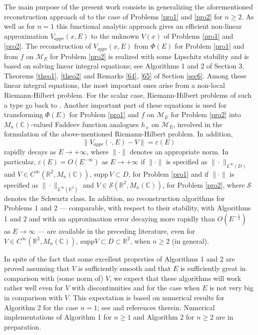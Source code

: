 \documentclass[11pt,a4paper,english,subeqn]{amsart}
\theoremstyle{plain}
\theoremstyle{definition}
\numberwithin{equation}{section}
\begin{document}
The main purpose of the present work consists in generalizing the aforementioned reconstruction approach of \cite{N3, N4} to the case of Problems \ref{pro1} and \ref{pro2} for $n \geq 2$. As well as for $n=1$ this functional analytic approach gives an efficient non-linear approximation $V_{appr}(x,E)$ to the unknown $V(x)$ of Problems \ref{pro1} and \ref{pro2}. The reconstruction of $V_{appr}(x,E)$ from $\Phi(E)$ for Problem \ref{pro1} and from $f$ on ${\mathscr{M}_E}$ for Problem \ref{pro2} is realized with some Lipschitz stability and is based on solving linear integral equations; see Algorithms 1 and 2 of Section 3, Theorems \ref{theo1}, \ref{theo2} and Remarks \ref{64}, \ref{65} of Section \ref{sec6}. Among these linear integral equations, the most important ones arise from a non-local Riemann-Hilbert problem. For the scalar case, Riemann-Hilbert problems of such a type go
back to \cite{M}. Another important part of these equations is used for transforming $\Phi(E)$ for Problem \ref{pro1} and $f$ on ${\mathscr{M}_E}$ for Problem \ref{pro2} into ${M_{n}({\mathbb{C}})}$-valued Faddeev function analogues $h_{\pm}$ on ${\mathscr{M}_E}$, involved in the formulation of the above-mentioned Riemann-Hilbert problem. In addition,
\begin{equation} \nonumber
\| V_{appr}(\cdot , E) - V\| = \varepsilon(E)
\end{equation}
rapidly decays as $E \to +\infty$, where $\| \cdot \|$ denotes an appropriate norm. In par\-ticular, $\varepsilon(E) = O(E^{- \infty})$ as $E \to + \infty$ if $\| \cdot \|$ is specified as $\| \cdot \|_{L^{\infty}(D)}$ and $V \in C^{\infty}({\mathbb{R}}^2, {M_{n}({\mathbb{C}})})$, $\mathrm{supp}\, V \subset D$, for Problem \ref{pro1} and if $\| \cdot \|$ is specified as $\| \cdot \|_{L^{\infty}({\mathbb{R}}^2)}$ and $V \in {\mathcal{S}}({\mathbb{R}}^2, {M_{n}({\mathbb{C}})})$, for Problem \ref{pro2}, where ${\mathcal{S}}$ denotes the Sch\-wartz class.
In addition, no reconstruction algorithms for Problems 1 and 2 --- comparable, with respect to their stability, with Algorithms 1 and 2 and with an approximation error decaying more rapidly than $O(E^{-\frac 1 2})$ as $E \to \infty$ --- are available in the preceding literature, even for $V \in C^{\infty}({\mathbb{R}}^2, {M_{n}({\mathbb{C}})})$, $\mathrm{supp} V \subset D \subset {\mathbb{R}}^2$, when $n \geq 2$ (in general).

In spite of the fact that some excellent properties of Algorithms 1 and 2 are proved assuming that $V$ is sufficiently smooth and that $E$ is sufficiently great in comparison with (some norm of) $V$, we expect that these algorithms will work rather well even for $V$ with discontinuities and for the case when $E$ is not very big in comparison with $V$. This expectation is based on numerical results for Algorithm 2 for the case $n=1$; see \cite{BAR} and references therein. Numerical implementations of Algorithm 1 for $n \geq 1$ and Algorithm 2 for $n \geq 2$ are in preparation.\smallskip
\end{document}
